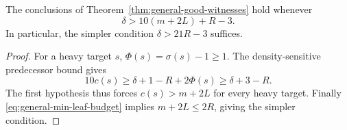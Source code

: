 \begin{corollary}
\label{cor:general-witness-threshold}
The conclusions of Theorem~\ref{thm:general-good-witnesses} hold
whenever
\[
 \delta>10(m+2L)+R-3.
\]
In particular, the simpler condition $\delta>21R-3$ suffices.
\end{corollary}
\begin{proof}
For a heavy target $s$, $\Phi(s)=\sigma(s)-1\ge1$.
The density-sensitive predecessor bound gives
\[
 10c(s)\ge\delta+1-R+2\Phi(s)\ge\delta+3-R.
\]
The first hypothesis thus forces $c(s)>m+2L$ for every heavy
target.  Finally \eqref{eq:general-min-leaf-budget} implies
$m+2L\le2R$, giving the simpler condition.
\end{proof}
